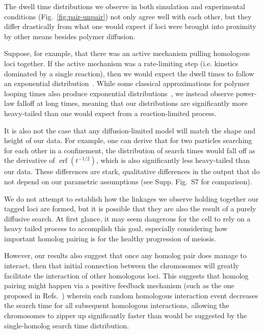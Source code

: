 \documentclass[9pt,twocolumn,twoside,lineno]{pnas-new}
\DeclareMathOperator\erf{erf}
\begin{document}
The dwell time distributions we observe in both simulation and experimental conditions (Fig.~\ref{fig:pair-unpair}) not only agree well with each other, but they differ drastically from what one would expect if loci were brought into proximity by other means besides polymer diffusion.

Suppose, for example, that there was an active mechanism pulling homologous loci together. If the active mechanism was a rate-limiting step (i.e. kinetics dominated by a single reaction), then we would expect the dwell times to follow an exponential distribution~\cite{doob1942,gillespie1977}. While some classical approximations for polymer looping times also produce exponential distributions~\cite{wilemski1974}, we instead observe power-law falloff at long times, meaning that our distributions are significantly more heavy-tailed than one would expect from a reaction-limited process.

It is also not the case that any diffusion-limited model will match the shape and height of our data. For example, one can derive that for two particles searching for each other in a confinement, the distribution of search times would fall off as the derivative of $\erf(t^{-1/2})$, which is also significantly less heavy-tailed than our data. These differences are stark, qualitative differences in the output that do not depend on our parametric assumptions (see Supp. Fig.\ S7 for comparison).

We do not attempt to establish how the linkages we observe holding together our tagged loci are formed, but it is possible that they are also the result of a purely diffusive search. At first glance, it may seem dangerous for the cell to rely on a heavy tailed process to accomplish this goal, especially considering how important homolog pairing is for the healthy progression of meiosis.


However, our results also suggest that once any homolog pair does manage to interact, then that initial connection between the chromosomes will greatly facilitate the interaction of other homologous loci. This suggests that homolog pairing might happen via a positive feedback mechanism (such as the one proposed in Refs.~\cite{lewis1954,loidl1990,marshall2016,marshall2019}) wherein each random homologous interaction event decreases the search time for all subsequent homologous interactions, allowing the chromosomes to zipper up significantly faster than would be suggested by the single-homolog search time distribution.
\end{document}
